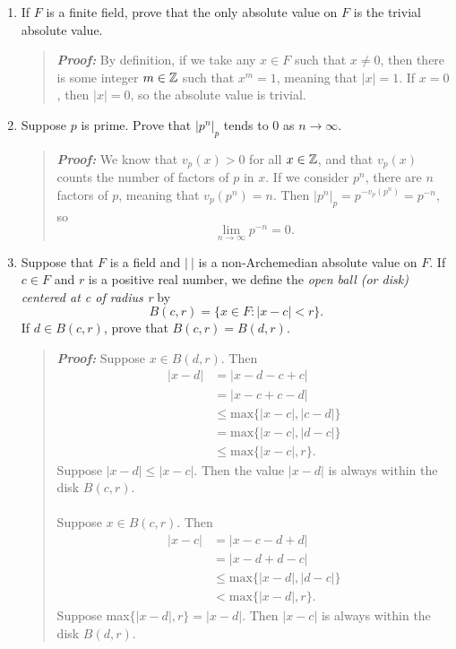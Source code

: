\documentclass{hw}
\begin{document}

\begin{enumerate}
	\item If $F$ is a finite field, prove that the only absolute value on $F$ is the trivial absolute
	      value.
	      \begin{quote}
	      	\textit{\textbf{Proof:}} By definition, if we take any $x\in F$ such that $x\neq0$, then there is some
	      	integer $m\in\mathbb{Z}$ such that $x^{m}=1$, meaning that $|x|=1$. If $x=0$, then $|x|=0$, so the absolute
	      	value is trivial.
	      \end{quote}

	\item Suppose $p$ is prime. Prove that $|p^{n}|_{p}$ tends to 0 as $n\to\infty$.
	      \begin{quote}
	      	\textit{\textbf{Proof:}} We know that $v_{p}(x)>0$ for all $x\in\mathbb{Z}$, and that $v_{p}(x)$ counts the
	      	number of factors of $p$ in $x$. If we consider $p^n$, there are $n$ factors of $p$, meaning that
	      	$v_{p}(p^{n})=n$. Then $|p^{n}|_{p}=p^{-v_{p}(p^{n})}=p^{-n}$, so
	      	\[
	      		\lim_{n\to\infty}p^{-n}=0.
	      	\]
	      \end{quote}

	\item Suppose that $F$ is a field and $|\ |$ is a non-Archemedian absolute value on $F$. If $c\in F$
	      and $r$ is a positive real number, we define the \textit{open ball (or disk) centered at c of radius r}
	      by
	      \[
	      	B(c,r)=\{x\in F:|x-c|<r\}.
	      \]
	      If $d\in B(c,r)$, prove that $B(c,r)=B(d,r)$.
	      \begin{quote}
	      	\textit{\textbf{Proof:}} Suppose $x\in B(d,r)$. Then
			\begin{align*}
				|x-d| &= |x-d-c+c|\\
				&= |x-c + c-d|\\
				&\leq \text{max}\{|x-c|,|c-d|\}\\
				&= \text{max}\{|x-c|,|d-c|\}\\
				&\leq\text{max}\{|x-c|,r\}.
			\end{align*}
			Suppose $|x-d|\leq |x-c|$. Then the value $|x-d|$ is always within the disk $B(c,r)$.\\\\
			Suppose $x\in B(c,r)$. Then
			\begin{align*}
				|x-c| &= |x-c-d+d|\\
				&= |x-d + d-c|\\
				&\leq \text{max}\{|x-d|,|d-c|\}\\
				&<\text{max}\{|x-d|,r\}.
			\end{align*}
			Suppose max$\{|x-d|,r\} = |x-d|$. Then $|x-c|$ is always within the disk $B(d,r)$.
	      \end{quote}
\end{enumerate}
\end{document}
